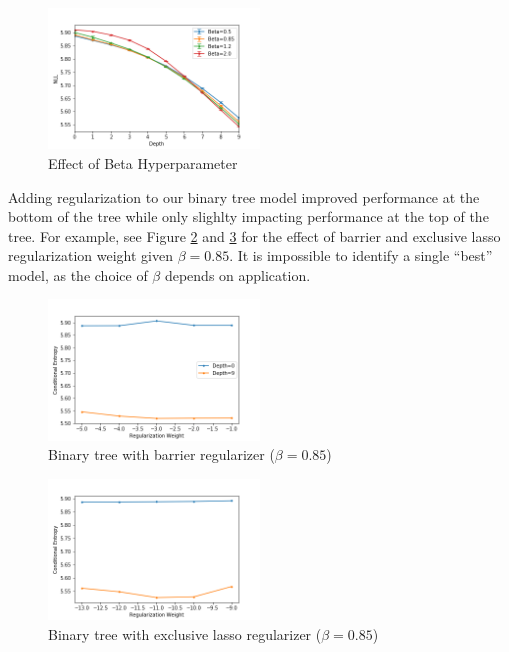 \documentclass[11pt,letterpaper]{article}
\begin{document}
\begin{figure}
  \caption{Effect of Beta Hyperparameter}
\label{f:beta}
  \centering
    \includegraphics[width=0.5\textwidth]{skipgram_tree.png}
\end{figure}

Adding regularization to our binary tree model improved performance at the bottom of the tree while only slighlty impacting performance at the top of the tree. For example, see Figure \ref{f:btb} and \ref{f:btel} for the effect of barrier and exclusive lasso regularization weight given $\beta=0.85$. It is impossible to identify a single ``best'' model, as the choice of $\beta$ depends on application.

\begin{figure}
  \caption{Binary tree with barrier regularizer ($\beta=0.85$)}
\label{f:btb}
  \centering
    \includegraphics[width=0.5\textwidth]{skipgram_tree_b_0.png}
\end{figure}
\begin{figure}
  \caption{Binary tree with exclusive lasso regularizer ($\beta=0.85$)}
\label{f:btel}
  \centering
    \includegraphics[width=0.5\textwidth]{skipgram_tree_el_0.png}
\end{figure}
\end{document}
